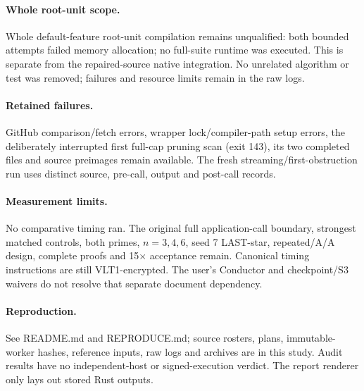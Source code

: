 \documentclass[10pt,a4paper]{article}
\begin{document}
\paragraph{Whole root-unit scope.} Whole default-feature root-unit compilation remains unqualified: both bounded attempts failed memory allocation; no full-suite runtime was executed. This is separate from the repaired-source native integration. No unrelated algorithm or test was removed; failures and resource limits remain in the raw logs.
\paragraph{Retained failures.} GitHub comparison/fetch errors, wrapper lock/compiler-path setup errors, the deliberately interrupted first full-cap pruning scan (exit 143), its two completed files and source preimages remain available. The fresh streaming/first-obstruction run uses distinct source, pre-call, output and post-call records.
\paragraph{Measurement limits.} No comparative timing ran. The original full application-call boundary, strongest matched controls, both primes, $n=3,4,6$, seed 7 LAST-star, repeated/A/A design, complete proofs and 15$\times$ acceptance remain. Canonical timing instructions are still VLT1-encrypted. The user's Conductor and checkpoint/S3 waivers do not resolve that separate document dependency.
\paragraph{Reproduction.} See README.md and REPRODUCE.md; source rosters, plans, immutable-worker hashes, reference inputs, raw logs and archives are in this study. Audit results have no independent-host or signed-execution verdict. The report renderer only lays out stored Rust outputs.
\end{document}
